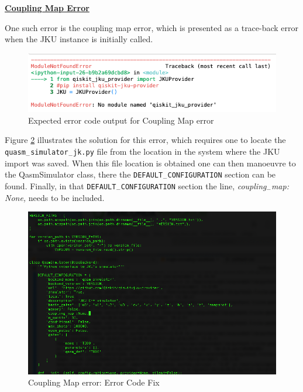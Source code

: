 \vspace{0.4cm}
\textbf{\underline{Coupling Map Error}}

One such error is the coupling map error, which is presented as a trace-back error when the JKU instance is initially called. 

\begin{figure}[H]
      \centering
      \includegraphics[scale=0.5]{background/ERRH.png}
      \caption{Expected error code output for Coupling Map error }
      \label{ERRC}
\end{figure}
Figure \ref{CMapFix} illustrates the solution for this error, which requires one to locate the \texttt{quasm$_-$simulator$_-$jk.py} file from the location in the system where the JKU import was saved. When this file location is obtained one can then manoeuvre to the QasmSimulator class, there %
the \texttt{DEFAULT$_-$CONFIGURATION} section can be found. Finally, in that \texttt{DEFAULT$_-$CONFIGURATION} section the line, \emph{coupling$_-$map: None,} needs to be included.



\begin{figure}[H]
      \centering
      \includegraphics[scale=0.6]{background/CouplinMapFix.png}
      \caption{ Coupling Map error: Error Code Fix }
      \label{CMapFix}
\end{figure}


